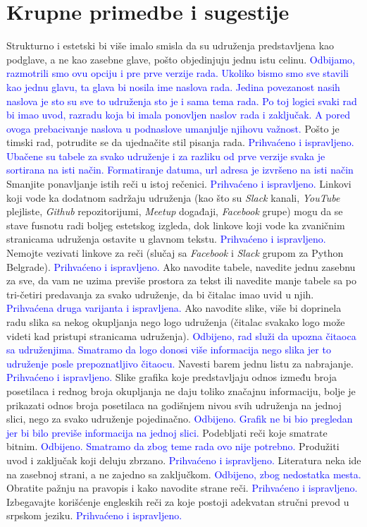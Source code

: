 \documentclass[a4paper]{report}
\newcommand{\odgovor}[1]{\textcolor{blue}{#1}}
\begin{document}
\section{Krupne primedbe i sugestije}
Strukturno i estetski bi više imalo smisla da su udruženja predstavljena kao podglave, 
a ne kao zasebne glave, pošto objedinjuju jednu istu celinu.
\odgovor{Odbijamo, razmotrili smo ovu opciju i pre prve verzije rada. Ukoliko bismo smo sve stavili kao jednu glavu, ta glava bi nosila ime naslova rada. Jedina povezanost nasih naslova je sto su sve to udruženja sto je i sama tema rada. Po toj logici svaki rad bi imao uvod, razradu koja bi imala ponovljen naslov rada i zaključak. A pored ovoga prebacivanje naslova u podnaslove umanjulje njihovu važnost.}
Pošto je timski rad, potrudite se da ujednačite stil pisanja rada.
\odgovor{Prihvaćeno i ispravljeno. Ubačene su tabele za svako udruženje i za razliku od prve verzije svaka je sortirana na isti način. Formatiranje datuma, url adresa je izvršeno na isti način} %
Smanjite ponavljanje istih reči u istoj rečenici.
\odgovor{Prihvaćeno i ispravljeno.}
Linkovi koji vode ka dodatnom sadržaju udruženja (kao što su \textit{Slack} kanali, \textit{YouTube} plejliste, \textit{Github} repozitorijumi, 
\textit{Meetup} događaji, \textit{Facebook} grupe) mogu da se stave fusnotu radi boljeg estetskog izgleda, dok
linkove koji vode ka zvaničnim stranicama udruženja ostavite u glavnom tekstu. 
\odgovor{Prihvaćeno i ispravljeno.}
Nemojte vezivati linkove za reči (slučaj sa \textit{Facebook} i \textit{Slack} grupom za Python Belgrade). 
\odgovor{Prihvaćeno i ispravljeno.}
Ako navodite tabele, navedite jednu zasebnu za sve, da vam ne uzima previše prostora za tekst ili
navedite manje tabele sa po tri-četiri predavanja za svako udruženje, da bi čitalac imao uvid u njih.
\odgovor{Prihvaćena druga varijanta i ispravljena.}
Ako navodite slike, više bi doprinela radu slika sa nekog okupljanja nego logo 
udruženja (čitalac svakako logo može videti kad pristupi stranicama udruženja).
\odgovor{Odbijeno, rad služi da upozna čitaoca sa udruženjima. Smatramo da logo donosi više informacija nego slika jer to udruženje posle prepoznatljivo čitaocu.}
Navesti barem jednu listu za nabrajanje.
\odgovor{Prihvaćeno i ispravljeno.}
Slike grafika koje predstavljaju odnos između broja posetilaca
i rednog broja okupljanja ne daju toliko značajnu informaciju, bolje je prikazati odnos broja posetilaca na
godišnjem nivou svih udruženja na jednoj slici, nego za svako udruženje pojedinačno.
\odgovor{Odbijeno. Grafik ne bi bio pregledan jer bi bilo previše informacija na jednoj slici.}
Podebljati reči koje smatrate bitnim. \odgovor{Odbijeno. Smatramo da zbog teme rada ovo nije potrebno.}
Produžiti uvod i zaključak koji deluju zbrzano.  \odgovor{Prihvaćeno i ispravljeno.}
Literatura neka ide na zasebnoj strani, a ne zajedno sa zaključkom. \odgovor{Odbijeno, zbog nedostatka mesta.}
Obratite pažnju na pravopis i kako navodite strane reči. \odgovor{Prihvaćeno i ispravljeno.}
Izbegavajte korišćenje engleskih reči za koje postoji adekvatan stručni prevod u srpskom jeziku. \odgovor{Prihvaćeno i ispravljeno.}
\end{document}
